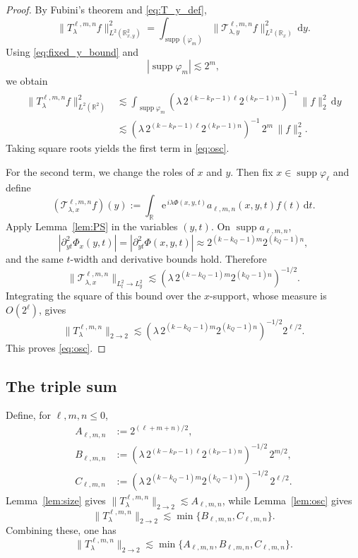 \documentclass[10pt]{amsart}
\numberwithin{equation}{section}
\theoremstyle{definition}
\theoremstyle{remark}
\theoremstyle{remark}
\newcommand{\R}{\mathbb{R}}
\newcommand{\e}{\mathrm{e}}
\newcommand{\supp}{\operatorname{supp}}
\begin{document}
\begin{proof}
		By Fubini's theorem and \eqref{eq:T_y_def},
		\[
		\|T_\lambda^{\ell,m,n}f\|_{L^2(\R^2_{x,y})}^2
		=
		\int_{\supp(\varphi_m)}
		\|\mathcal{T}_{\lambda,y}^{\ell,m,n}f\|_{L^2(\R_x)}^2\,\mathrm dy.
		\]
		Using \eqref{eq:fixed_y_bound} and
		\[
		|\supp\varphi_m|\lesssim 2^m,
		\]
		we obtain
		\begin{align*}
			\|T_\lambda^{\ell,m,n}f\|_{L^2(\R^2)}^2
			&\lesssim
			\int_{\supp\varphi_m}
			(\lambda\,2^{(k-k_P-1)\ell}2^{(k_P-1)n})^{-1}\,
			\|f\|_2^2\,\mathrm dy
			\\
			&\lesssim
			(\lambda\,2^{(k-k_P-1)\ell}2^{(k_P-1)n})^{-1}\,
			2^m\,\|f\|_2^2.
		\end{align*}
		Taking square roots yields the first term in \eqref{eq:osc}.
		
		
			For the second term, we change the roles of $x$ and $y$. Then fix $x\in\supp\varphi_\ell$ and define
			\[
			(\mathcal{T}_{\lambda,x}^{\ell,m,n}f)(y)
			:=
			\int_{\R}
			\e^{\,i\lambda\Phi(x,y,t)}a_{\ell,m,n}(x,y,t)f(t)\,\mathrm dt.
			\]
			Apply Lemma~\ref{lem:PS} in the variables $(y,t)$.  On $\supp a_{\ell,m,n}$,
			\[
            |\partial_{yt}^2\Phi_x(y,t)|
            =
			|\partial_{yt}^2\Phi(x,y,t)|
			\approx
			2^{(k-k_Q-1)m}2^{(k_Q-1)n},
			\]
			and the same $t$-width and derivative bounds hold.  Therefore
			\[
			\|\mathcal{T}_{\lambda,x}^{\ell,m,n}\|_{L^2_t\to L^2_y}
			\lesssim
			(\lambda\,2^{(k-k_Q-1)m}2^{(k_Q-1)n})^{-1/2}.
			\]
			Integrating the square of this bound over the $x$-support, whose measure is $O(2^\ell)$, gives
			\[
			\|T_{\lambda}^{\ell,m,n}\|_{2\to2}
			\lesssim
			(\lambda\,2^{(k-k_Q-1)m}2^{(k_Q-1)n})^{-1/2}2^{\ell/2}.
			\]
		This proves \eqref{eq:osc}.
	\end{proof}
	
	\subsection{The triple sum}
	
	Define, for $\ell,m,n\le 0$,
	\begin{align}
		A_{\ell,m,n}&:=2^{(\ell+m+n)/2},\label{eq:defA}\\
		B_{\ell,m,n}&:=(\lambda\,2^{(k-k_P-1)\ell}2^{(k_P-1)n})^{-1/2}\,2^{m/2},\label{eq:defB}\\
		C_{\ell,m,n}&:=(\lambda\,2^{(k-k_Q-1)m}2^{(k_Q-1)n})^{-1/2}\,2^{\ell/2}.\label{eq:defC}
	\end{align}
	Lemma~\ref{lem:size} gives $\|T_\lambda^{\ell,m,n}\|_{2\to2}\lesssim A_{\ell,m,n}$, while
	Lemma~\ref{lem:osc} gives 
    \[
        \|T_\lambda^{\ell,m,n}\|_{2\to2}\lesssim \min\{B_{\ell,m,n},C_{\ell,m,n}\}.
    \]
	Combining these, one has
	\begin{equation*}
		\|T_\lambda^{\ell,m,n}\|_{2\to2}
		\lesssim
		\min\{A_{\ell,m,n},B_{\ell,m,n},C_{\ell,m,n}\}.
	\end{equation*}
	
\end{document}
